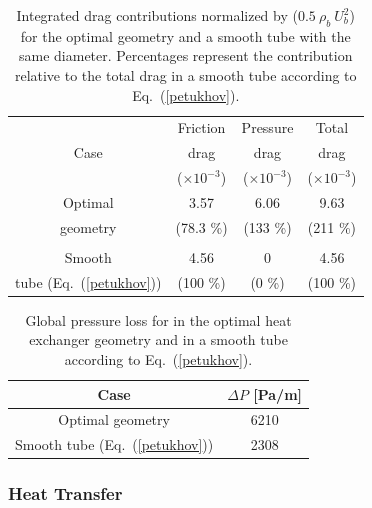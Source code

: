 \begin{table}
\small
\centering
\begin{tabular}{c|ccc}
   & Friction & Pressure & Total \\
  Case & drag  & drag & drag \\
   & ($\times 10^{-3}$) & ($\times 10^{-3}$) & ($\times 10^{-3}$) \\
  \hline
  Optimal & 3.57 & 6.06 & 9.63 \\
  geometry & (78.3 \%) & (133 \%) & (211 \%) \\
   & & & \\
  Smooth & 4.56 & 0 & 4.56 \\
  tube (Eq.~(\ref{petukhov})) & (100 \%) & (0 \%) & (100 \%) \\
  \hline
\end{tabular}
\caption{Integrated drag contributions normalized by ($0.5 ~ \rho_b ~ U_b^2$) for the optimal geometry and a smooth tube with the same diameter. Percentages represent the contribution relative to the total drag in a smooth tube according to Eq.~(\ref{petukhov}).}
\label{tab_drags}
\end{table}

\begin{table}
\small
\centering
\begin{tabular}{cc}
  Case & $\Delta P$ [Pa/m] \\
  \hline
  Optimal geometry & 6210 \\
  Smooth tube (Eq.~(\ref{petukhov})) & 2308 \\
  \hline
\end{tabular}
\caption{Global pressure loss for in the optimal heat exchanger geometry and in a smooth tube according to Eq.~(\ref{petukhov}).}
\label{tab_pressureloss}
\end{table}

\subsubsection{Heat Transfer}


